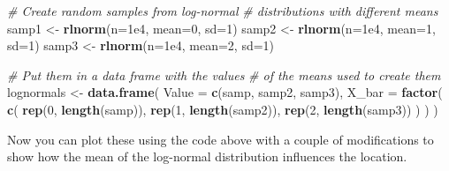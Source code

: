 \documentclass[
]{book}
\newenvironment{Shaded}{\begin{snugshade}}{\end{snugshade}}
\newcommand{\CommentTok}[1]{\textcolor[rgb]{0.56,0.35,0.01}{\textit{#1}}}
\newcommand{\DataTypeTok}[1]{\textcolor[rgb]{0.13,0.29,0.53}{#1}}
\newcommand{\DecValTok}[1]{\textcolor[rgb]{0.00,0.00,0.81}{#1}}
\newcommand{\FloatTok}[1]{\textcolor[rgb]{0.00,0.00,0.81}{#1}}
\newcommand{\KeywordTok}[1]{\textcolor[rgb]{0.13,0.29,0.53}{\textbf{#1}}}
\newcommand{\NormalTok}[1]{#1}
\newcommand{\StringTok}[1]{\textcolor[rgb]{0.31,0.60,0.02}{#1}}
\begin{document}
\begin{Shaded}
\begin{Highlighting}[]
\CommentTok{# Create random samples from log-normal}
\CommentTok{# distributions with different means}
\NormalTok{samp1 <-}\StringTok{ }\KeywordTok{rlnorm}\NormalTok{(}\DataTypeTok{n=}\FloatTok{1e4}\NormalTok{, }\DataTypeTok{mean=}\DecValTok{0}\NormalTok{, }\DataTypeTok{sd=}\DecValTok{1}\NormalTok{)}
\NormalTok{samp2 <-}\StringTok{ }\KeywordTok{rlnorm}\NormalTok{(}\DataTypeTok{n=}\FloatTok{1e4}\NormalTok{, }\DataTypeTok{mean=}\DecValTok{1}\NormalTok{, }\DataTypeTok{sd=}\DecValTok{1}\NormalTok{)}
\NormalTok{samp3 <-}\StringTok{ }\KeywordTok{rlnorm}\NormalTok{(}\DataTypeTok{n=}\FloatTok{1e4}\NormalTok{, }\DataTypeTok{mean=}\DecValTok{2}\NormalTok{, }\DataTypeTok{sd=}\DecValTok{1}\NormalTok{)}

\CommentTok{# Put them in a data frame with the values}
\CommentTok{# of the means used to create them}
\NormalTok{lognormals <-}\StringTok{ }\KeywordTok{data.frame}\NormalTok{(}
  \DataTypeTok{Value =} \KeywordTok{c}\NormalTok{(samp, samp2, samp3),}
  \DataTypeTok{X_bar =} \KeywordTok{factor}\NormalTok{(}
    \KeywordTok{c}\NormalTok{(}
      \KeywordTok{rep}\NormalTok{(}\DecValTok{0}\NormalTok{, }\KeywordTok{length}\NormalTok{(samp)), }
      \KeywordTok{rep}\NormalTok{(}\DecValTok{1}\NormalTok{, }\KeywordTok{length}\NormalTok{(samp2)), }
      \KeywordTok{rep}\NormalTok{(}\DecValTok{2}\NormalTok{, }\KeywordTok{length}\NormalTok{(samp3))}
\NormalTok{    )}
\NormalTok{  )}
\NormalTok{)}
\end{Highlighting}
\end{Shaded}

Now you can plot these using the code above with a couple of modifications to show how the mean of the log-normal distribution influences the location.
\end{document}
